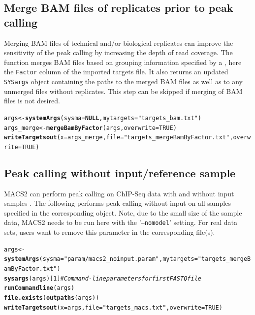 \documentclass{article}\usepackage[]{graphicx}\usepackage[]{color}
\makeatletter
\newcommand{\hlnum}[1]{\textcolor[rgb]{0.686,0.059,0.569}{#1}}%
\newcommand{\hlstr}[1]{\textcolor[rgb]{0.192,0.494,0.8}{#1}}%
\newcommand{\hlcom}[1]{\textcolor[rgb]{0.678,0.584,0.686}{\textit{#1}}}%
\newcommand{\hlstd}[1]{\textcolor[rgb]{0.345,0.345,0.345}{#1}}%
\newcommand{\hlkwa}[1]{\textcolor[rgb]{0.161,0.373,0.58}{\textbf{#1}}}%
\newcommand{\hlkwb}[1]{\textcolor[rgb]{0.69,0.353,0.396}{#1}}%
\newcommand{\hlkwc}[1]{\textcolor[rgb]{0.333,0.667,0.333}{#1}}%
\newcommand{\hlkwd}[1]{\textcolor[rgb]{0.737,0.353,0.396}{\textbf{#1}}}%
\newenvironment{kframe}{%
 \def\at@end@of@kframe{}%
 \ifinner\ifhmode%
  \def\at@end@of@kframe{\end{minipage}}%
  \begin{minipage}{\columnwidth}%
 \fi\fi%
 \def\FrameCommand##1{\hskip\@totalleftmargin \hskip-\fboxsep
 \colorbox{shadecolor}{##1}\hskip-\fboxsep
     \hskip-\linewidth \hskip-\@totalleftmargin \hskip\columnwidth}%
 \MakeFramed {\advance\hsize-\width
   \@totalleftmargin\z@ \linewidth\hsize
   \@setminipage}}%
 {\par\unskip\endMakeFramed%
 \at@end@of@kframe}
\newenvironment{knitrout}{}{} %
\newcommand{\Rfunarg}[1]{{\texttt{#1}}}
\makeatother
\begin{document}
\subsection{Merge BAM files of replicates prior to peak calling}
Merging BAM files of technical and/or biological replicates can improve the sensitivity of the peak calling by increasing the depth of read coverage. The  function merges BAM files based on grouping information specified by a , here the \Rfunarg{Factor} column of the imported targets file. It also returns an updated \Rfunarg{SYSargs} object containing the paths to the merged BAM files as well as to any unmerged files without replicates. This step can be skipped if merging of BAM files is not desired. 
\begin{knitrout}
\color{fgcolor}\begin{kframe}
\begin{alltt}
\hlstd{args} \hlkwb{<-} \hlkwd{systemArgs}\hlstd{(}\hlkwc{sysma}\hlstd{=}\hlkwa{NULL}\hlstd{,} \hlkwc{mytargets}\hlstd{=}\hlstr{"targets_bam.txt"}\hlstd{)}
\hlstd{args_merge} \hlkwb{<-} \hlkwd{mergeBamByFactor}\hlstd{(args,} \hlkwc{overwrite}\hlstd{=}\hlnum{TRUE}\hlstd{)}
\hlkwd{writeTargetsout}\hlstd{(}\hlkwc{x}\hlstd{=args_merge,} \hlkwc{file}\hlstd{=}\hlstr{"targets_mergeBamByFactor.txt"}\hlstd{,} \hlkwc{overwrite}\hlstd{=}\hlnum{TRUE}\hlstd{)}
\end{alltt}
\end{kframe}
\end{knitrout}

\subsection{Peak calling without input/reference sample}
MACS2 can perform peak calling on ChIP-Seq data with and without input samples \citep{Zhang2008-pc}. The following performs peak calling without input on all samples specified in the corresponding  object. Note, due to the small size of the sample data, MACS2 needs to be run here with the '\Rfunarg{--nomodel}' setting. For real data sets, users want to remove this parameter in the corresponding  file(s).
\begin{knitrout}
\color{fgcolor}\begin{kframe}
\begin{alltt}
\hlstd{args} \hlkwb{<-} \hlkwd{systemArgs}\hlstd{(}\hlkwc{sysma}\hlstd{=}\hlstr{"param/macs2_noinput.param"}\hlstd{,} \hlkwc{mytargets}\hlstd{=}\hlstr{"targets_mergeBamByFactor.txt"}\hlstd{)}
\hlkwd{sysargs}\hlstd{(args)[}\hlnum{1}\hlstd{]} \hlcom{# Command-line parameters for first FASTQ file}
\hlkwd{runCommandline}\hlstd{(args)}
\hlkwd{file.exists}\hlstd{(}\hlkwd{outpaths}\hlstd{(args))}
\hlkwd{writeTargetsout}\hlstd{(}\hlkwc{x}\hlstd{=args,} \hlkwc{file}\hlstd{=}\hlstr{"targets_macs.txt"}\hlstd{,} \hlkwc{overwrite}\hlstd{=}\hlnum{TRUE}\hlstd{)}
\end{alltt}
\end{kframe}
\end{knitrout}
\end{document}
